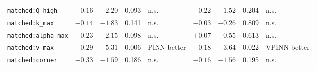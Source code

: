 \begin{table}[htbp]
\begin{tabular}{@{}lrrrlrrrl@{}}
\addlinespace
\texttt{matched:Q\_high} & $-0.16$ & $-2.20$ & 0.093 & n.s. & $-0.22$ & $-1.52$ & 0.204 & n.s. \\
\texttt{matched:k\_max} & $-0.14$ & $-1.83$ & 0.141 & n.s. & $-0.03$ & $-0.26$ & 0.809 & n.s. \\
\texttt{matched:alpha\_max} & $-0.23$ & $-2.15$ & 0.098 & n.s. & $+0.07$ & $0.55$ & 0.613 & n.s. \\
\texttt{matched:v\_max} & $-0.29$ & $-5.31$ & 0.006 & PINN better & $-0.18$ & $-3.64$ & 0.022 & VPINN better \\
\texttt{matched:corner} & $-0.33$ & $-1.59$ & 0.186 & n.s. & $-0.16$ & $-1.56$ & 0.195 & n.s. \\
\bottomrule
\end{tabular}
\end{table}
